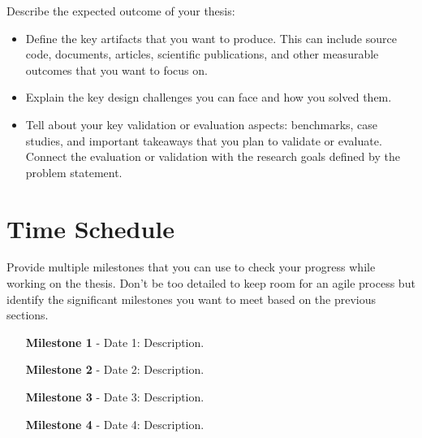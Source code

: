\begin{tcolorbox}[breakable]
	Describe the expected outcome of your thesis:
	\begin{itemize}
		\item Define the key artifacts that you want to produce. This can include source code, documents, articles, scientific publications, and other measurable outcomes that you want to focus on.
		\item Explain the key design challenges you can face and how you solved them.
		\item Tell about your key validation or evaluation aspects: benchmarks, case studies, and important takeaways that you plan to validate or evaluate. Connect the evaluation or validation with the research goals defined by the problem statement.
	\end{itemize}
\end{tcolorbox}

\section*{Time Schedule}

\begin{tcolorbox}[breakable]
	Provide multiple milestones that you can use to check your progress while working on the thesis.
	Don't be too detailed to keep room for an agile process but identify the significant milestones you want to meet based on the previous sections.
\end{tcolorbox}

\begin{itemize}[itemindent=-13pt, leftmargin=43pt, align=left]
    \item[\textbf{Milestone 1} - Date 1:] Description.
    \item[\textbf{Milestone 2} - Date 2:] Description.
    \item[\textbf{Milestone 3} - Date 3:] Description.
    \item[\textbf{Milestone 4} - Date 4:] Description.
\end{itemize}


\backmatter









